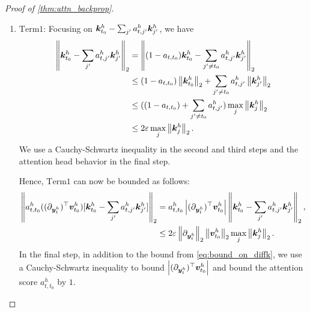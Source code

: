 \begin{proof}[Proof of \cref{thm:attn_backprop}]
    \begin{enumerate}
        \item $\mathrm{Term 1}$: Focusing on ${\bm{k}}^h_{t_0} - \sum_{j'} a^h_{t, j'} {\bm{k}}^{h}_{j'}$, we have
        \begin{align}
            \left\|{\bm{k}}^h_{t_0} - \sum_{j'} a^h_{t, j'} {\bm{k}}^{h}_{j'}\right\|_2 &= \left\| (1 - a_{t, t_0}) {\bm{k}}^h_{t_0} - \sum_{j' \ne t_0} a^h_{t, j'} {\bm{k}}^{h}_{j'} \right\|_2 \nonumber\\&
            \leq (1 - a_{t, t_0}) \left\| {\bm{k}}^h_{t_0} \right\|_2 + \sum_{j' \ne t_0}  a^h_{t, j'} \left\| {\bm{k}}^{h}_{j'} \right\|_2 \nonumber\\&
            \leq  ( (1 - a_{t, t_0}) + \sum_{j' \ne t_0}  a^h_{t, j'} ) \max_{j} \left\| {\bm{k}}^h_j \right\|_2 \nonumber\\&
            \leq 2 \varepsilon \max_{j} \left\| {\bm{k}}^h_j \right\|_2 \label{eq:bound_on_diffk}.
        \end{align}
        We use a Cauchy-Schwartz inequality in the second and third steps and the attention head behavior in the final step.

        Hence, $\mathrm{Term 1}$ can now be bounded as follows:
        \begin{align*}
            \left\| a^h_{t, t_0} ( (\partial_{{\bm{y}}_t^h})^{\top} {\bm{v}}^{h}_{t_0} ) [ {\bm{k}}^h_{t_0} - \sum_{j'} a^h_{t, j'} {\bm{k}}^{h}_{j'} ] \right\|_2 &=  a^h_{t, t_0}  \left|  (\partial_{{\bm{y}}_t^h})^{\top} {\bm{v}}^{h}_{t_0}  \right| \left\|  {\bm{k}}^h_{t_0} - \sum_{j'} a^h_{t, j'} {\bm{k}}^{h}_{j'} \right\|_2, \\&
            \leq 2 \varepsilon \left\| \partial_{{\bm{y}}_t^h} \right\|_2 \left\| {\bm{v}}^{h}_{t_0} \right\|_2   \max_{j} \left\| {\bm{k}}^h_j \right\|_2.
        \end{align*}
        In the final step, in addition to the bound from \cref{eq:bound_on_diffk}, we use a  Cauchy-Schwartz inequality to bound $\left|  (\partial_{{\bm{y}}_t^h})^{\top} {\bm{v}}^{h}_{t_0}  \right|$ and bound the attention score $a^h_{t, t_0} $ by $1$.
        

\end{enumerate}
\end{proof}
